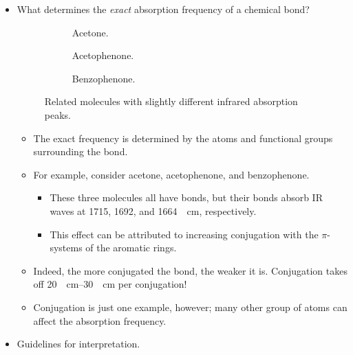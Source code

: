 \documentclass[../notes.tex]{subfiles}
\begin{document}
\begin{itemize}
    \item What determines the \emph{exact} absorption frequency of a chemical bond?
    \begin{figure}[h!]
        \centering
        \footnotesize
        \begin{subfigure}[b]{0.25\linewidth}
            \centering
            \caption{Acetone.}
            \label{fig:IRexacta}
        \end{subfigure}
        \begin{subfigure}[b]{0.3\linewidth}
            \centering
            \caption{Acetophenone.}
            \label{fig:IRexactb}
        \end{subfigure}
        \begin{subfigure}[b]{0.3\linewidth}
            \centering
            \caption{Benzophenone.}
            \label{fig:IRexactc}
        \end{subfigure}
        \caption{Related molecules with slightly different infrared absorption peaks.}
        \label{fig:IRexact}
    \end{figure}
    \begin{itemize}
        \item The exact frequency is determined by the atoms and functional groups surrounding the bond.
        \item For example, consider acetone, acetophenone, and benzophenone.
        \begin{itemize}
            \item These three molecules all have  bonds, but their  bonds absorb IR waves at 1715, 1692, and \SI{1664}{\per\centi\meter}, respectively.
            \item This effect can be attributed to increasing conjugation with the $\pi$-systems of the aromatic rings.
        \end{itemize}
        \item Indeed, the more conjugated the  bond, the weaker it is. Conjugation takes off \SIrange{20}{30}{\per\centi\meter} per conjugation!
        \item Conjugation is just one example, however; many other group of atoms can affect the absorption frequency.
    \end{itemize}
    \item Guidelines for interpretation.
    \begin{itemize}

\end{itemize}
\end{itemize}
\end{document}
